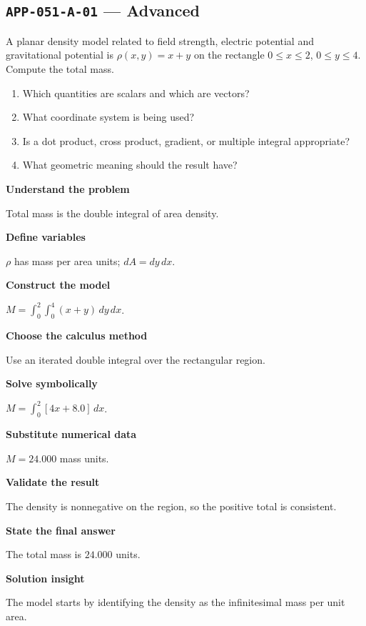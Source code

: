 \documentclass[11pt]{book}
\newcommand{\pid}[1]{\texttt{#1}}
\begin{document}
\subsection*{\pid{APP-051-A-01} — Advanced}
\begin{problembox}
A planar density model related to field strength, electric potential and gravitational potential is $\rho(x,y)=x+y$ on the rectangle $0\le x\le 2$, $0\le y\le 4$. Compute the total mass.
\end{problembox}
\begin{promptbox}\begin{enumerate}
\item Which quantities are scalars and which are vectors?
\item What coordinate system is being used?
\item Is a dot product, cross product, gradient, or multiple integral appropriate?
\item What geometric meaning should the result have?
\end{enumerate}\end{promptbox}
\begin{solutionbox}
\textbf{Understand the problem}\par Total mass is the double integral of area density.\par\medskip
\textbf{Define variables}\par $\rho$ has mass per area units; $dA=dy\,dx$.\par\medskip
\textbf{Construct the model}\par $M=\int_0^{2}\int_0^{4}(x+y)\,dy\,dx$.\par\medskip
\textbf{Choose the calculus method}\par Use an iterated double integral over the rectangular region.\par\medskip
\textbf{Solve symbolically}\par $M=\int_0^{2}[4x+8.0]\,dx$.\par\medskip
\textbf{Substitute numerical data}\par $M=24.000$ mass units.\par\medskip
\textbf{Validate the result}\par The density is nonnegative on the region, so the positive total is consistent.\par\medskip
\textbf{State the final answer}\par The total mass is $24.000$ units.\par\medskip
\textbf{Solution insight}\par The model starts by identifying the density as the infinitesimal mass per unit area.\par\medskip
\end{solutionbox}
\end{document}
